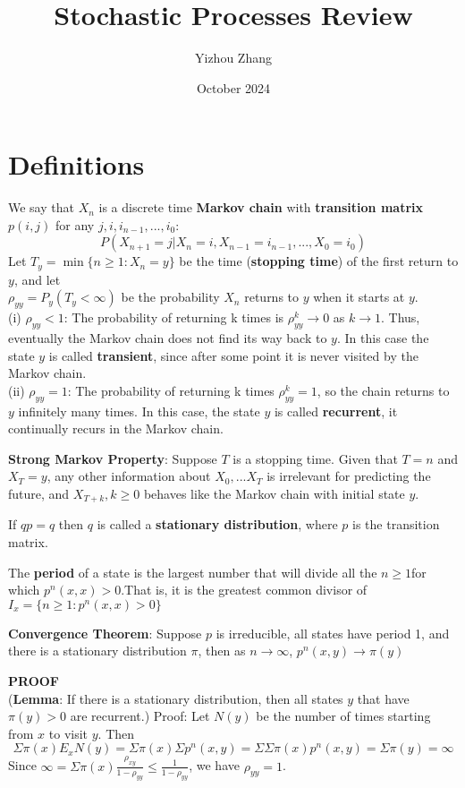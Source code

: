 \documentclass{article}
\title{Stochastic Processes Review}
\author{Yizhou Zhang}
\date{October 2024}
\begin{document}
\maketitle

\section{Definitions}
We say that $X_n$ is a discrete time \textbf{Markov chain} with \textbf{transition matrix} $p(i,j)$ for any $j,i,i_{n-1},...,i_0$:
\[
P(X_{n+1}=j|X_n=i,X_{n-1}=i_{n-1},...,X_0=i_0)
\]
Let $T_y = \min\{n\geq1:X_n=y\}$ be the time (\textbf{stopping time}) of the first return to $y$, and let\\ $\rho_{yy} = P_y(T_y<\infty)$ be the probability $X_n$ returns to $y$ when it starts at $y$.\\
(i) $\rho_{yy} < 1$: The probability of returning k times is $\rho^k_{yy}  \rightarrow 0 $ as $ k \rightarrow 1$. Thus, eventually the Markov chain does not find its way back to $y$. In this case the state $y$ is called \textbf{transient}, since after some point it is never visited by the
Markov chain.\\
(ii) $\rho_{yy} = 1$: The probability of returning k times $\rho^k_{yy} = 1$, so the chain returns to $y$ infinitely many times. In this case, the state $y$ is called \textbf{recurrent}, it continually recurs in the Markov chain.\par
\textbf{Strong Markov Property}: Suppose $T$ is a stopping time. Given that $T = n$ and $X_T = y$, any other information about $X_0, . . .X_T$ is irrelevant for predicting the future, and $X_{T+k}, k \geq 0$ behaves like the Markov chain with initial state $y$.\par
If $qp=q$ then $q$ is called a \textbf{stationary distribution}, where $p$ is the transition matrix.\par
The \textbf{period} of a state is the largest number that will divide all the $n\geq 1$for which $p^n(x,x)>0$.That is, it is the greatest common divisor of $I_x=\{n\geq1: p^n(x,x)>0\}$\par
\textbf{Convergence Theorem}: Suppose $p$ is irreducible, all states have period 1, and there is a stationary distribution $\pi$, then as $n\rightarrow\infty$, $p^n(x,y)\rightarrow\pi(y)$\par
\textbf{PROOF}\\
(\textbf{Lemma}: If there is a stationary distribution, then all states $y$ that have $\pi(y)>0$ are recurrent.)
Proof: Let $N(y)$ be the number of times starting from $x$ to visit $y$. Then 
\[
\Sigma \pi(x)E_xN(y) = \Sigma\pi(x)\Sigma p^n(x,y) = \Sigma\Sigma \pi(x)p^n(x,y)=\Sigma\pi(y) = \infty
\]
Since $\infty = \Sigma\pi(x)\frac{\rho_{xy}}{1-\rho_{yy}}\leq\frac{1}{1-\rho_{yy}}$, we have $\rho_{yy}=1$.
\par
\end{document}
